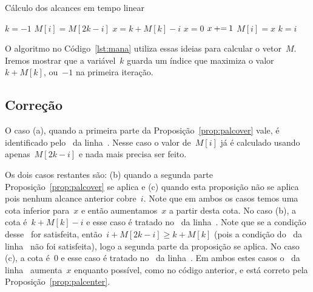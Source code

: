 \begin{algorithm}
\caption{Cálculo dos alcances em tempo linear} \label{lst:mana}
\begin{algorithmic}[1]
\State $k = -1$
 \label{man:for}
     \label{man:caso1} 
        \State $M[i] = M[2k - i]$
    \Else
         \label{man:caso2} 
            \State $x = k + M[k] - i$
        \Else \label{man:caso3} 
            \State $x = 0$
        \EndIf
          \label{man:while}
            \State $x \mathbin{{\tiny +}{=}} 1$
        \EndWhile
        \State $M[i] = x$ \label{man:updx}
        \State $k = i$ \label{man:updk}
    \EndIf
\EndFor
\end{algorithmic}
\end{algorithm}


O algoritmo no Código~\ref{lst:mana} utiliza essas ideias para calcular o vetor~$M$. Iremos mostrar que a variável~$k$ guarda um índice que maximiza o valor~${k + M[k]}$, ou~$-1$ na primeira iteração.

\subsection{Correção}
O caso (a), quando a primeira parte da Proposição~\ref{prop:palcover} vale, é identificado pelo~ da linha~. Nesse caso o valor de~$M[i]$ já é calculado usando apenas~$M[2k-i]$ e nada mais precisa ser feito.

Os dois casos restantes são: (b) quando a segunda parte Proposição~\ref{prop:palcover} se aplica e (c) quando esta proposição não se aplica pois nenhum alcance anterior cobre~$i$. Note que em ambos os casos temos uma cota inferior para~$x$ e então aumentamos~$x$ a partir desta cota. No caso (b), a cota é~${k + M[k] - i}$ e esse caso é tratado no~ da linha~. Note que se a condição desse~ for satisfeita, então~${i + M[2k-i] \geq k + M[k]}$ (pois a condição do~ da linha~ não foi satisfeita), logo a segunda parte da proposição se aplica. No caso (c), a cota é~$0$ e esse caso é tratado no~ da linha~. Em ambos estes casos o~ da linha~ aumenta~$x$ enquanto possível, como no código anterior, e está correto pela Proposição~\ref{prop:palcenter}.

